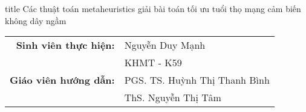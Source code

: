 \begin{frame}
    \vfill
    \centering
    \begin{beamercolorbox}[sep=8pt,center,shadow=true,rounded=true]{title}
        \Large Các thuật toán metaheuristics giải bài toán tối ưu tuổi thọ mạng cảm  biến không dây ngầm
    \end{beamercolorbox}
    \vspace{2cm}
    \begin{table}[H]
        \raggedleft
        \begin{tabular}{rl}
        \textbf{Sinh viên thực hiện:} & Nguyễn Duy Mạnh               \\
                             & KHMT - K59             \\
        \textbf{Giáo viên hướng dẫn:} & PGS. TS. Huỳnh Thị Thanh Bình \\
                             & ThS. Nguyễn Thị Tâm          
        \end{tabular}
    \end{table}
    \vfill
\end{frame}